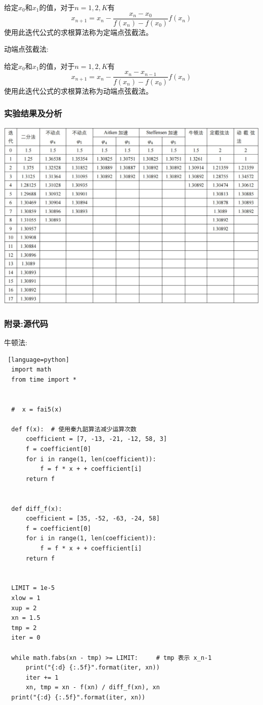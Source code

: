 \documentclass[UTF8]{ctexart}
\begin{document}
给定$x_0$和$x_1$的值，对于$n=1, 2, K$有
$$
x_{n+1}=x_{n}-\frac{x_{n}-x_{0}}{f\left(x_{n}\right)-f\left(x_{0}\right)} f\left(x_{n}\right)
$$
使用此迭代公式的求根算法称为定端点弦截法。

\quad

动端点弦截法:

给定$x_0$和$x_1$的值，对于$n=1, 2, K$有
$$
x_{n+1}=x_{n}-\frac{x_{n}-x_{n-1}}{f\left(x_{n}\right)-f\left(x_{0}\right)} f\left(x_{n}\right)
$$
使用此迭代公式的求根算法称为动端点弦截法。
\subsubsection{实验结果及分析}
\begin{center}
  \includegraphics[scale=0.5]{test.jpg}
\end{center}
\subsubsection{附录:源代码}
牛顿法:
\begin{lstlisting} [language=python]
  import math
  from time import *
  
  
  #  x = fai5(x)
  
  def f(x):  # 使用秦九韶算法减少运算次数
      coefficient = [7, -13, -21, -12, 58, 3]
      f = coefficient[0]
      for i in range(1, len(coefficient)):
          f = f * x + + coefficient[i]
      return f
  
  
  def diff_f(x):
      coefficient = [35, -52, -63, -24, 58]
      f = coefficient[0]
      for i in range(1, len(coefficient)):
          f = f * x + + coefficient[i]
      return f
  
  
  LIMIT = 1e-5
  xlow = 1
  xup = 2
  xn = 1.5
  tmp = 2
  iter = 0
  
  while math.fabs(xn - tmp) >= LIMIT:     # tmp 表示 x_n-1
      print("{:d} {:.5f}".format(iter, xn))
      iter += 1
      xn, tmp = xn - f(xn) / diff_f(xn), xn
  print("{:d} {:.5f}".format(iter, xn))  
\end{lstlisting}
\end{document}
